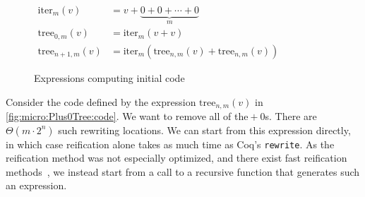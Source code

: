 \begin{figure}
{\small $\begin{aligned}
\text{iter}_m(v) & = v + \underbrace{0 + 0 + \cdots + 0}_m \\
\text{tree}_{0,m}(v) &= \text{iter}_m(v + v) \\
\text{tree}_{n+1,m}(v) &= \text{iter}_m(\text{tree}_{n,m}(v) + \text{tree}_{n,m}(v))
\end{aligned}$}%
\caption{\label{fig:micro:Plus0Tree:code}Expressions computing initial code}
\end{figure}
Consider the code defined by the expression $\text{tree}_{n,m}(v)$ in \autoref{fig:micro:Plus0Tree:code}.
We want to remove all of the${}+0$s.
There are $\Theta(m \cdot 2^n)$ such rewriting locations.
We can start from this expression directly, in which case reification alone takes as much time as Coq's \texttt{rewrite}.
As the reification method was not especially optimized, and there exist fast reification methods~\cite{reification-by-parametricity}, we instead start from a call to a recursive function that generates such an expression.
\label{sec:reif-not-optimized}%

\egroup

